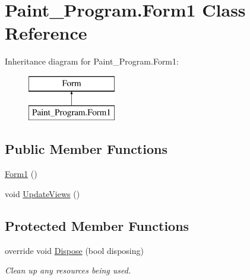 \hypertarget{class_paint___program_1_1_form1}{}\section{Paint\+\_\+\+Program.\+Form1 Class Reference}
\label{class_paint___program_1_1_form1}
Inheritance diagram for Paint\+\_\+\+Program.\+Form1\+:\begin{figure}[H]
\begin{center}
\leavevmode
\includegraphics[height=2.000000cm]{class_paint___program_1_1_form1}
\end{center}
\end{figure}
\subsection*{Public Member Functions}
\begin{DoxyCompactItemize}
\item 
\mbox{\hyperlink{class_paint___program_1_1_form1_aefb0d3ee7baac9f44e9d742615ec526d}{Form1}} ()
\item 
void \mbox{\hyperlink{class_paint___program_1_1_form1_a3d5993c6aaba845e13b8b5d76e38f447}{Update\+Views}} ()
\end{DoxyCompactItemize}
\subsection*{Protected Member Functions}
\begin{DoxyCompactItemize}
\item 
override void \mbox{\hyperlink{class_paint___program_1_1_form1_a0bd4c16e36005c28132ae0785f626e90}{Dispose}} (bool disposing)
\begin{DoxyCompactList}\small\item\em Clean up any resources being used. \end{DoxyCompactList}\end{DoxyCompactItemize}
